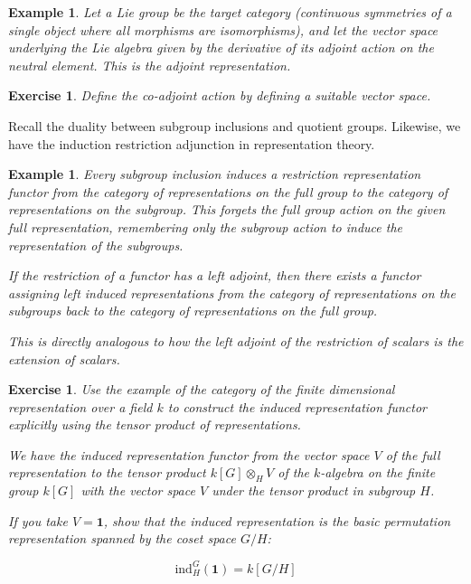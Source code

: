 \documentclass{tufte-book}
\newtheorem{example}[theorem]{Example}
\newtheorem{exercise}[theorem]{Exercise}
\begin{document}
\begin{example}
	Let a Lie group be the target category (continuous symmetries of a single object where all morphisms are isomorphisms), and let the vector space underlying the Lie algebra given by the derivative of its adjoint action on the neutral element. This is the adjoint representation.
\end{example}

\begin{exercise}
	Define the co-adjoint action by defining a suitable vector space.
\end{exercise}

Recall the duality between subgroup inclusions and quotient groups. Likewise, we have the induction restriction adjunction in representation theory.

\begin{example}
	Every subgroup inclusion induces a restriction representation functor from the category of representations on the full group to the category of representations on the subgroup. This forgets the full group action on the given full representation, remembering only the subgroup action to induce the representation of the subgroups.

	If the restriction of a functor has a left adjoint, then there exists a functor assigning left induced representations from the category of representations on the subgroups back to the category of representations on the full group. 
	
	This is directly analogous to how the left adjoint of the restriction of scalars is the extension of scalars.
\end{example}

\begin{exercise}
	Use the example of the category of the finite dimensional representation over a field $k$ to construct the induced representation functor explicitly using the tensor product of representations.

	We have the induced representation functor from the vector space $V$ of the full representation to the tensor product $k[G] \otimes_H V$ of the $k$-algebra on the finite group $k[G]$ with the vector space $V$ under the tensor product in subgroup $H$.
	
	If you take $V = \mathbf{1}$, show that the induced representation is the basic permutation representation spanned by the coset space $G/H$:

	\begin{equation}
		\mathrm{ind}_H^{G} (\mathbf{1})
		= k[G / H]
	\end{equation}

\end{exercise}
\end{document}
